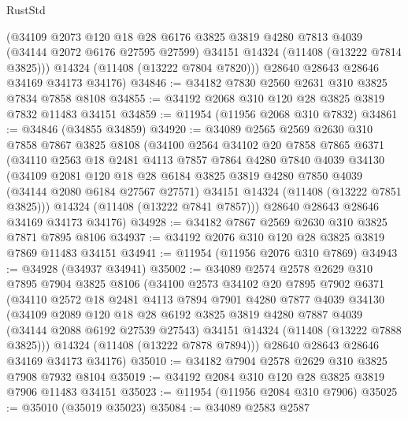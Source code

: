 \begin{lexlean}{RustStd}
\begin{coremodule}
        (@34109
          @2073
          @120
          @18
          @28
          @6176
          @3825
          @3819
          @4280
          @7813
          @4039
          (@34144 @2072 @6176 @27595 @27599)
          @34151
          @14324
          (@11408 (@13222 @7814 @3825)))
        @14324
        (@11408 (@13222 @7804 @7820)))
      @28640
      @28643
      @28646
      @34169
      @34173
      @34176)
@34846 := @34182 @7830 @2560 @2631 @310 @3825 @7834 @7858 @8108
@34855 := @34192 @2068 @310 @120 @28 @3825 @3819 @7832 @11483 @34151
@34859 := @11954 (@11956 @2068 @310 @7832)
@34861 := @34846 (@34855 @34859)
@34920 := @34089
    @2565
    @2569
    @2630
    @310
    @7858
    @7867
    @3825
    @8108
    (@34100
      @2564
      @34102
      @20
      @7858
      @7865
      @6371
      (@34110
        @2563
        @18
        @2481
        @4113
        @7857
        @7864
        @4280
        @7840
        @4039
        @34130
        (@34109
          @2081
          @120
          @18
          @28
          @6184
          @3825
          @3819
          @4280
          @7850
          @4039
          (@34144 @2080 @6184 @27567 @27571)
          @34151
          @14324
          (@11408 (@13222 @7851 @3825)))
        @14324
        (@11408 (@13222 @7841 @7857)))
      @28640
      @28643
      @28646
      @34169
      @34173
      @34176)
@34928 := @34182 @7867 @2569 @2630 @310 @3825 @7871 @7895 @8106
@34937 := @34192 @2076 @310 @120 @28 @3825 @3819 @7869 @11483 @34151
@34941 := @11954 (@11956 @2076 @310 @7869)
@34943 := @34928 (@34937 @34941)
@35002 := @34089
    @2574
    @2578
    @2629
    @310
    @7895
    @7904
    @3825
    @8106
    (@34100
      @2573
      @34102
      @20
      @7895
      @7902
      @6371
      (@34110
        @2572
        @18
        @2481
        @4113
        @7894
        @7901
        @4280
        @7877
        @4039
        @34130
        (@34109
          @2089
          @120
          @18
          @28
          @6192
          @3825
          @3819
          @4280
          @7887
          @4039
          (@34144 @2088 @6192 @27539 @27543)
          @34151
          @14324
          (@11408 (@13222 @7888 @3825)))
        @14324
        (@11408 (@13222 @7878 @7894)))
      @28640
      @28643
      @28646
      @34169
      @34173
      @34176)
@35010 := @34182 @7904 @2578 @2629 @310 @3825 @7908 @7932 @8104
@35019 := @34192 @2084 @310 @120 @28 @3825 @3819 @7906 @11483 @34151
@35023 := @11954 (@11956 @2084 @310 @7906)
@35025 := @35010 (@35019 @35023)
@35084 := @34089
    @2583
    @2587

\end{coremodule}
\end{lexlean}
